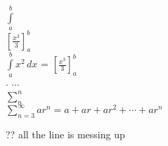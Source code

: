 \documentclass[12pt]{article}
\begin{document}
$ \int \limits_{a}^{b} $\\

$[\frac{x^3}{3}]_a^b $\\

$ \int \limits_{a}^{b} x^2\,dx$ = $\left[\frac{x^3}{3}\right]_a^b $\\

$\cdot$ $\cdots$ \\


$\sum \limits_{n}^{n} $\\

$\sum \limits_{n=3}^{\infty} ar^n = a+ar+ar^2+\cdots+ar^n$\\

\par
\par
\par
\par
\par







?? all the line is messing up
\end{document}
